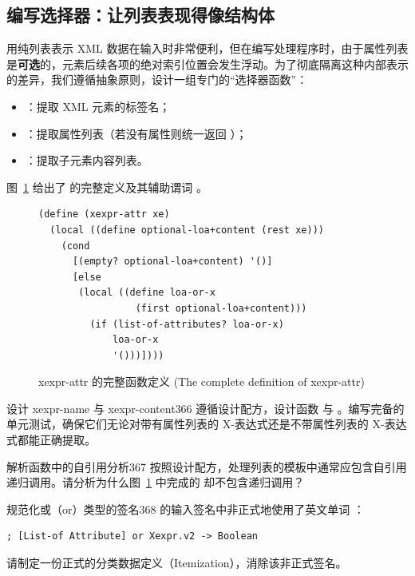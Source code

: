 \subsection{编写选择器：让列表表现得像结构体}

用纯列表表示 XML 数据在输入时非常便利，但在编写处理程序时，由于属性列表是\textbf{可选}的，元素后续各项的绝对索引位置会发生浮动。为了彻底隔离这种内部表示的差异，我们遵循抽象原则，设计一组专门的“选择器函数”：
\begin{itemize}
  \item {}：提取 XML 元素的标签名；
  \item {}：提取属性列表（若没有属性则统一返回 ）；
  \item {}：提取子元素内容列表。
\end{itemize}

图~\ref{fig:126} 给出了  的完整定义及其辅助谓词 。

\begin{figure}[htbp]
  \centering
\begin{lstlisting}[language=BSL]
(define (xexpr-attr xe)
  (local ((define optional-loa+content (rest xe)))
    (cond
      [(empty? optional-loa+content) '()]
      [else
       (local ((define loa-or-x
                 (first optional-loa+content)))
         (if (list-of-attributes? loa-or-x)
             loa-or-x
             '()))])))
\end{lstlisting}
  \caption{xexpr-attr 的完整函数定义 (The complete definition of xexpr-attr)}
  \label{fig:126}
\end{figure}

\begin{exercise}{设计 xexpr-name 与 xexpr-content}{366}
遵循设计配方，设计函数  与 。编写完备的单元测试，确保它们无论对带有属性列表的 X-表达式还是不带属性列表的 X-表达式都能正确提取。
\end{exercise}

\begin{exercise}{解析函数中的自引用分析}{367}
按照设计配方，处理列表的模板中通常应包含自引用递归调用。请分析为什么图~\ref{fig:126} 中完成的  却不包含递归调用？
\end{exercise}

\begin{exercise}{规范化或（or）类型的签名}{368}
 的输入签名中非正式地使用了英文单词 ：
\begin{lstlisting}[language=BSL]
; [List-of Attribute] or Xexpr.v2 -> Boolean
\end{lstlisting}
请制定一份正式的分类数据定义（Itemization），消除该非正式签名。
\end{exercise}

